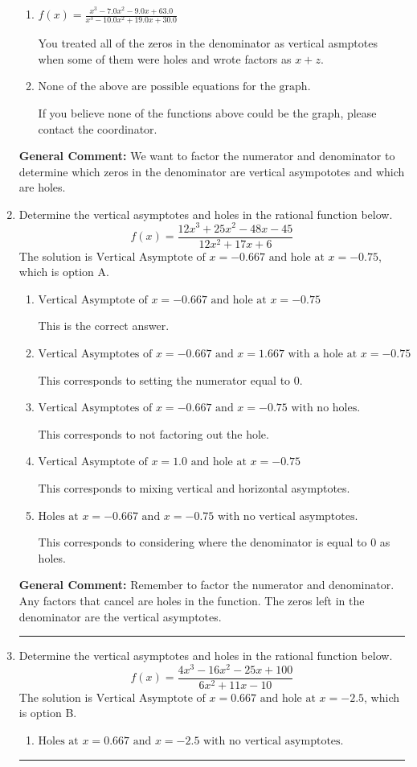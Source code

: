 \documentclass{extbook}[14pt]
\newcommand{\litem}[1]{\item #1

\rule{\textwidth}{0.4pt}}
\begin{document}
\begin{enumerate}
{\begin{enumerate}[label=\Alph*.]
This is the correct answer!
\item \( f(x)=\frac{x^{3} -7.0 x^{2} -9.0 x + 63.0}{x^{3} -10.0 x^{2} +19.0 x + 30.0} \)

You treated all of the zeros in the denominator as vertical asmptotes when some of them were holes and wrote factors as $x+z$.
\item \( \text{None of the above are possible equations for the graph.} \)

If you believe none of the functions above could be the graph, please contact the coordinator.
\end{enumerate}

\textbf{General Comment:} We want to factor the numerator and denominator to determine which zeros in the denominator are vertical asympototes and which are holes.
}
\litem{
Determine the vertical asymptotes and holes in the rational function below.
\[ f(x) = \frac{12x^{3} +25 x^{2} -48 x -45}{12x^{2} +17 x + 6} \]The solution is \( \text{Vertical Asymptote of } x = -0.667 \text{ and hole at } x = -0.75 \), which is option A.\begin{enumerate}[label=\Alph*.]
\item \( \text{Vertical Asymptote of } x = -0.667 \text{ and hole at } x = -0.75 \)

This is the correct answer.
\item \( \text{Vertical Asymptotes of } x = -0.667 \text{ and } x = 1.667 \text{ with a hole at } x = -0.75 \)

This corresponds to setting the numerator equal to 0.
\item \( \text{Vertical Asymptotes of } x = -0.667 \text{ and } x = -0.75 \text{ with no holes.} \)

This corresponds to not factoring out the hole.
\item \( \text{Vertical Asymptote of } x = 1.0 \text{ and hole at } x = -0.75 \)

This corresponds to mixing vertical and horizontal asymptotes.
\item \( \text{Holes at } x = -0.667 \text{ and } x = -0.75 \text{ with no vertical asymptotes.} \)

This corresponds to considering where the denominator is equal to 0 as holes.
\end{enumerate}

\textbf{General Comment:} Remember to factor the numerator and denominator. Any factors that cancel are holes in the function. The zeros left in the denominator are the vertical asymptotes.
}
\litem{
Determine the vertical asymptotes and holes in the rational function below.
\[ f(x) = \frac{4x^{3} -16 x^{2} -25 x + 100}{6x^{2} +11 x -10} \]The solution is \( \text{Vertical Asymptote of } x = 0.667 \text{ and hole at } x = -2.5 \), which is option B.\begin{enumerate}[label=\Alph*.]
\item \( \text{Holes at } x = 0.667 \text{ and } x = -2.5 \text{ with no vertical asymptotes.} \)


\end{enumerate}}
\end{enumerate}
\end{document}

